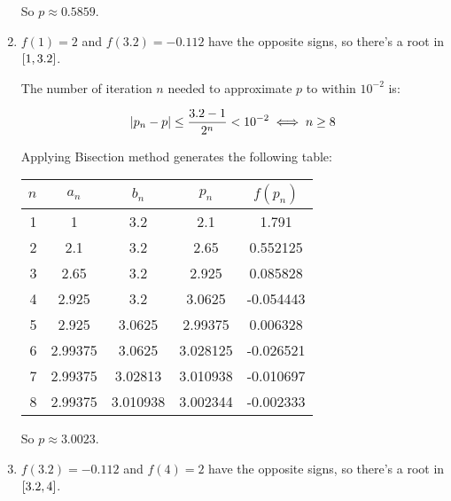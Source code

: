 \documentclass[../../../../Assignments.tex]{subfiles}
\begin{document}
\begin{solution}
\begin{enumerate}[label = (\alph*)]
            So \(p \approx \num{0.5859}\).

        \item \(f(1) = 2\) and \(f(\num{3.2}) = \num{-0.112}\) have the opposite
            signs, so there's a root in \(\interval{1}{\num{3.2}}\).

            The number of iteration \(n\) needed to approximate \(p\) to within
            \(10^{-2}\) is:

            \[\abs{p_n - p} \leq \frac{\num{3.2} - 1}{2^n} < 10^{-2} \iff n \geq 8\]

            Applying Bisection method generates the following table:

            \begin{table}[H]
                \centering
                \begin{tabular}{r S[table-format=1.5] S[table-format=1.6] S[table-format=1.6] S[table-format=-1.6]}
                    \toprule
                    \(n\)  &  {\(a_n\)}  &  {\(b_n\)}  &  {\(p_n\)}  &  {\(f(p_n)\)}  \\
                      &  1          &  3.2        &  2.1        &   1.791        \\
                        2  &  2.1        &  3.2        &  2.65       &   0.552125     \\
                        3  &  2.65       &  3.2        &  2.925      &   0.085828     \\
                        4  &  2.925      &  3.2        &  3.0625     &  -0.054443     \\
                        5  &  2.925      &  3.0625     &  2.99375    &   0.006328     \\
                        6  &  2.99375    &  3.0625     &  3.028125   &  -0.026521     \\
                        7  &  2.99375    &  3.02813    &  3.010938   &  -0.010697     \\
                        8  &  2.99375    &  3.010938   &  3.002344   &  -0.002333     \\
                    \bottomrule
                \end{tabular}
            \end{table}

            So \(p \approx \num{3.0023}\).

        \item \(f(\num{3.2}) = \num{-0.112}\) and \(f(4) = 2\) have the opposite
            signs, so there's a root in \(\interval{\num{3.2}}{4}\).


\end{enumerate}
\end{solution}
\end{document}
